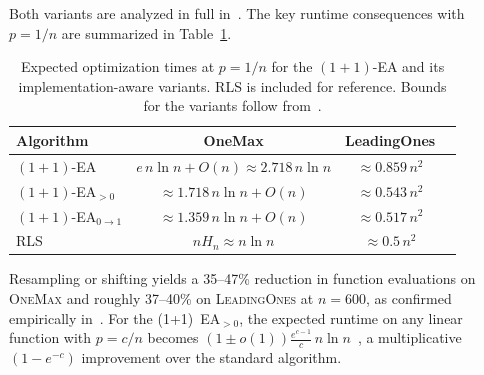 Both variants are analyzed in full
in~\cite{pinto2018practice,jansen2011analysis}. The key runtime
consequences with $p = 1/n$ are summarized in
Table~\ref{app:tab:variant-runtimes}.

\begin{table}[h]
  \centering
  \begin{tabular}{lccc}
    \hline
    \textbf{Algorithm} & \textbf{OneMax} & \textbf{LeadingOnes} \\
    \hline
    $(1+1)$-EA         & $e\,n\ln n + O(n) \approx 2.718\,n\ln n$ &
    $\approx 0.859\,n^2$ \\
    $(1+1)$-EA$_{>0}$  & $\approx 1.718\,n\ln n + O(n)$           &
    $\approx 0.543\,n^2$ \\
    $(1+1)$-EA$_{0\to1}$ & $\approx 1.359\,n\ln n + O(n)$         &
    $\approx 0.517\,n^2$ \\
    RLS                & $n H_n \approx n\ln n$                    &
    $\approx 0.5\,n^2$   \\
    \hline
  \end{tabular}
  \caption[Expected times for EA variants]{Expected optimization
    times at $p = 1/n$ for the $(1+1)$-EA and its
    implementation-aware variants. RLS is included for reference.
    Bounds for the variants follow
  from~\cite{pinto2018practice,bottcher2010optimal,witt2013tight}.}
  \label{app:tab:variant-runtimes}
\end{table}

\noindent Resampling or shifting yields a 35--47\% reduction in
function evaluations on
\textsc{OneMax} and roughly 37--40\% on \textsc{LeadingOnes} at $n = 600$, as
confirmed empirically in~\cite{pinto2018practice}. For the (1+1)~EA$_{>0}$, the
expected runtime on any linear function with $p = c/n$ becomes
$(1\pm o(1))\frac{e^{c-1}}{c}\,n\ln n$~\cite{pinto2018practice}, a
multiplicative
$(1-e^{-c})$ improvement over the standard algorithm.

%
